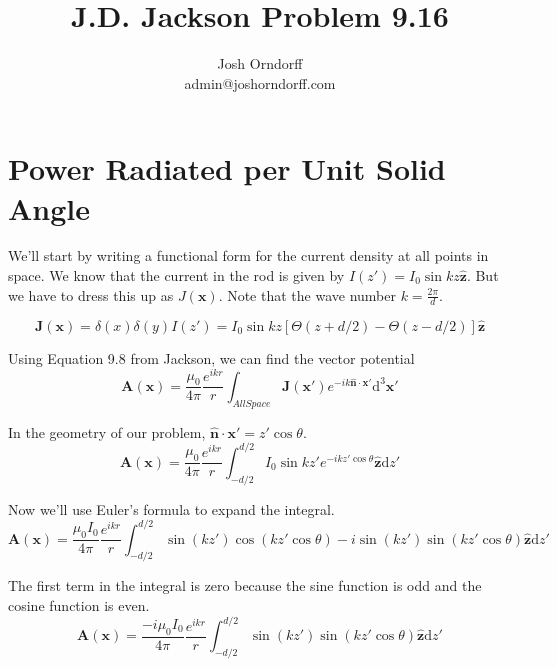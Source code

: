 \documentclass[10pt,a4paper]{article}
\begin{document}
\title{J.D. Jackson Problem 9.16}
\author{Josh Orndorff \\ admin@joshorndorff.com}
\maketitle

\section{Power Radiated per Unit Solid Angle}
We'll start by writing a functional form for the current density at all points in space.  We know that the current in the rod is given by $I(z')=I_0\sin kz \hat{\mathbf{z}}$.  But we have to dress this up as $J(\mathbf{x})$.  Note that the wave number $k=\frac{2\pi}{d}$.

\begin{equation}
\mathbf{J}(\mathbf{x})=\delta(x)\delta(y)I(z')=I_0\sin kz [\Theta(z+d/2)-\Theta(z-d/2)]\hat{\mathbf{z}}
\end{equation}

Using Equation 9.8 from Jackson, we can find the vector potential
\begin{equation}
\mathbf{A}(\mathbf{x})=\frac{\mu_0}{4\pi}\frac{e^{ikr}}{r}\int_{All Space}\mathbf{J}(\mathbf{x'})e^{-ik\hat{\mathbf{n}}\cdot\mathbf{x'}} \mathrm{d}^3\mathbf{x'}
\end{equation}

In the geometry of our problem, $\hat{\mathbf{n}}\cdot\mathbf{x'} = z'\cos\theta$.
\begin{equation}
\mathbf{A}(\mathbf{x})=\frac{\mu_0}{4\pi}\frac{e^{ikr}}{r}\int_{-d/2}^{d/2}I_0\sin kz'e^{-ikz'\cos\theta}\hat{\mathbf{z}} \mathrm{d}z'
\end{equation}

Now we'll use Euler's formula to expand the integral.
\begin{equation}
\mathbf{A}(\mathbf{x})=\frac{\mu_0 I_0}{4\pi}\frac{e^{ikr}}{r}\int_{-d/2}^{d/2}\sin (kz') \cos(kz'\cos\theta)-i\sin (kz') \sin(kz'\cos\theta) \hat{\mathbf{z}} \mathrm{d}z'
\end{equation}

The first term in the integral is zero because the sine function is odd and the cosine function is even.
\begin{equation}
\mathbf{A}(\mathbf{x})=\frac{-i\mu_0 I_0}{4\pi}\frac{e^{ikr}}{r}\int_{-d/2}^{d/2}\sin (kz') \sin(kz'\cos\theta) \hat{\mathbf{z}} \mathrm{d}z'
\end{equation}
\end{document}
